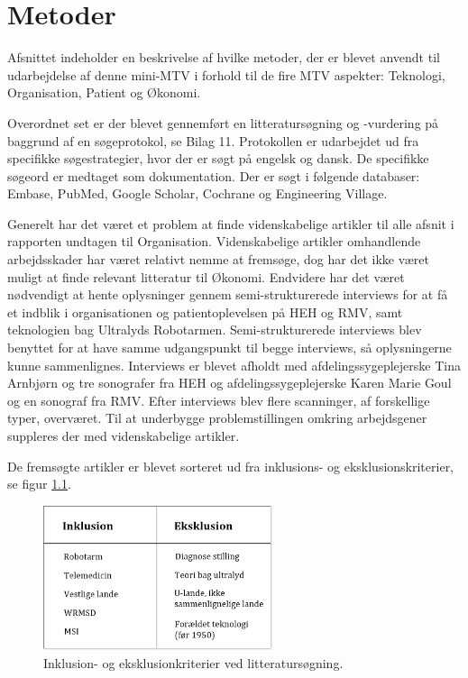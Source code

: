 \chapter{Metoder}
Afsnittet indeholder en beskrivelse af hvilke metoder, der er blevet anvendt til udarbejdelse af denne mini-MTV i forhold til de fire MTV aspekter: Teknologi, Organisation, Patient og Økonomi.

Overordnet set er der blevet gennemført en litteratursøgning og -vurdering på baggrund af en søgeprotokol, se Bilag 11. Protokollen er udarbejdet ud fra specifikke søgestrategier, hvor der er søgt på engelsk og dansk. De specifikke søgeord er medtaget som dokumentation. Der er søgt i følgende databaser: Embase, PubMed, Google Scholar, Cochrane og Engineering Village. 

Generelt har det været et problem at finde videnskabelige artikler til alle afsnit i rapporten undtagen til Organisation. Videnskabelige artikler omhandlende arbejdsskader har været relativt nemme at fremsøge, dog har det ikke været muligt at finde relevant litteratur til Økonomi. Endvidere har det været nødvendigt at hente oplysninger gennem semi-strukturerede interviews for at få et indblik i organisationen og patientoplevelsen på HEH og RMV, samt teknologien bag Ultralyds Robotarmen. Semi-strukturerede interviews blev benyttet for at have samme udgangspunkt til begge interviews, så oplysningerne kunne sammenlignes. 
Interviews er blevet afholdt med afdelingssygeplejerske Tina Arnbjørn og tre sonografer fra HEH og  afdelingssygeplejerske Karen Marie Goul og en sonograf fra RMV. Efter interviews blev flere scanninger, af forskellige typer, overværet. 
Til at underbygge problemstillingen omkring arbejdsgener suppleres der med videnskabelige artikler.   

De fremsøgte artikler er blevet sorteret ud fra inklusions- og eksklusionskriterier, se figur \ref{InklusionEksklusion}. 

\begin{figure}[H]\centering
	\includegraphics[width = 0.6\textwidth]{Figurer/InklusionEksklusion}
	\caption{Inklusion- og eksklusionkriterier ved litteratursøgning.}
	\label{InklusionEksklusion}
\end{figure}

